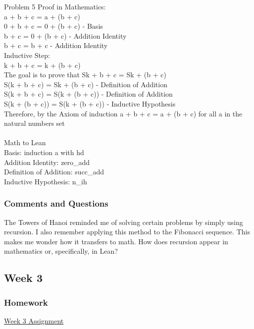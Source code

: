 \documentclass{article}
\theoremstyle{theorem}
\theoremstyle{definition}
\theoremstyle{remark}
\begin{document}
Problem 5 Proof in Mathematics:\\
a + b + c =  a + (b + c)\\
0 + b + c = 0 + (b + c) - Basis\\
b + c = 0 + (b + c) - Addition Identity\\
b + c = b + c - Addition Identity\\
Inductive Step:\\
k + b + c = k + (b + c)\\
The goal is to prove that Sk + b + c = Sk + (b + c)\\
S(k + b + c) = Sk + (b + c) - Definition of Addition\\
S(k + b + c) = S(k + (b + c)) - Definition of Addition\\
S(k + (b + c)) = S(k + (b + c)) - Inductive Hypothesis\\
Therefore, by the Axiom of induction a + b + c =  a + (b + c) for all a in the natural numbers set\\
\\
Math to Lean\\
Basis: induction a with hd\\
Addition Identity: zero\_add\\
Definition of Addition: succ\_add\\
Inductive Hypothesis: n\_ih\\

\subsubsection*{Comments and Questions}
The Towers of Hanoi reminded me of solving certain problems by simply using recursion. 
I also remember applying this method to the Fibonacci sequence. This makes me wonder 
how it transfers to math. How does recursion 
appear in mathematics or, specifically, in Lean?

\subsection{Week 3}

\subsubsection*{Homework}
\href{https://github.com/sarah-yoon/CPSC354_Week3/blob/main/README.md}{Week 3 Assignment}\\
\end{document}
